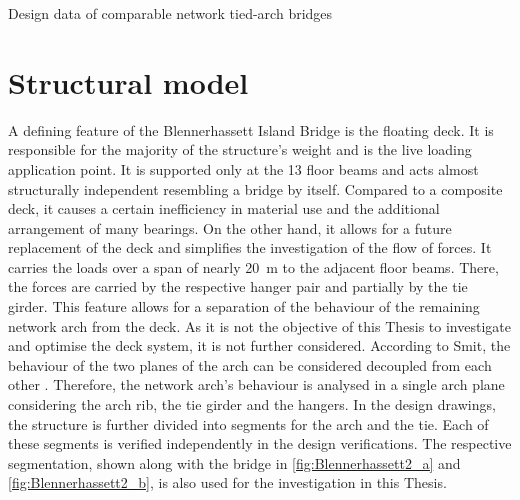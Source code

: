 \begin{table}[H]
    \centering    
    \caption{Design data of comparable network tied-arch bridges}
    \label{tab:other_design_data}
    \resizebox{\columnwidth}{!}{%
    
    }
\end{table}

\newpage
\section{Structural model} \label{sec:met_str}
A defining feature of the Blennerhassett Island Bridge is the floating deck. It is responsible for the majority of the structure's weight and is the live loading application point. It is supported only at the 13 floor beams and acts almost structurally independent resembling a bridge by itself. Compared to a composite deck, it causes a certain inefficiency in material use and the additional arrangement of many bearings. On the other hand, it allows for a future replacement of the deck and simplifies the investigation of the flow of forces. It carries the loads over a span of nearly \SI{20}{m} to the adjacent floor beams. There, the forces are carried by the respective hanger pair and partially by the tie girder. This feature allows for a separation of the behaviour of the remaining network arch from the deck. As it is not the objective of this Thesis to investigate and optimise the deck system, it is not further considered. According to Smit, the behaviour of the two planes of the arch can be considered decoupled from each other \cite{Smit}. Therefore, the network arch's behaviour is analysed in a single arch plane considering the arch rib, the tie girder and the hangers. In the design drawings, the structure is further divided into segments for the arch and the tie. Each of these segments is verified independently in the design verifications. The respective segmentation, shown along with the bridge in \cref{fig:Blennerhassett2_a} and \cref{fig:Blennerhassett2_b}, is also used for the investigation in this Thesis.

